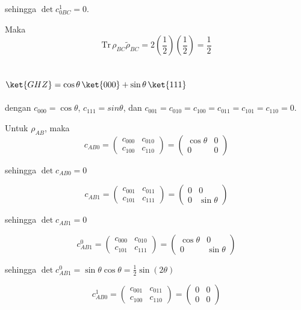 sehingga $\det c_{0BC}^1 = 0$.

Maka
\begin{equation}
	\mathrm{Tr}\,\rho_{BC}\tilde{\rho}_{BC}=2(\frac{1}{2})(\frac{1}{2})=\frac{1}{2}
\end{equation}

\subsection{$\ket{GHZ}=\cos\theta\,\ket{000} + \sin\theta\,\ket{111}$}
dengan $c_{000}=\cos\theta$, $c_{111}=sin\theta$, dan $c_{001}=c_{010}=c_{100}=c_{011}=c_{101}=c_{110}=0$.

Untuk $\rho_{AB}$, maka
\begin{equation}
	c_{AB0}=
	\begin{pmatrix}
		c_{000} & c_{010} \\
		c_{100} & c_{110}
	\end{pmatrix}=
	\begin{pmatrix}
		\cos\theta & 0 \\
		0 & 0
	\end{pmatrix}
\end{equation}

sehingga $\det c_{AB0} = 0$

\begin{equation}
	c_{AB1}=
	\begin{pmatrix}
		c_{001} & c_{011} \\
		c_{101} & c_{111}
	\end{pmatrix}=
	\begin{pmatrix}
		0 & 0 \\
		0 & \sin\theta
	\end{pmatrix}
\end{equation}

sehingga $\det c_{AB1} = 0$

\begin{equation}
	c_{AB1}^0=
	\begin{pmatrix}
		c_{000} & c_{010} \\
		c_{101} & c_{111}
	\end{pmatrix}=
	\begin{pmatrix}
		\cos\theta & 0 \\
		0 & \sin\theta
	\end{pmatrix}
\end{equation}

sehingga $\det c_{AB1}^0 = \sin\theta \cos\theta = \frac{1}{2}\sin(2\theta)$

\begin{equation}
	c_{AB0}^1=
	\begin{pmatrix}
		c_{001} & c_{011} \\
		c_{100} & c_{110}
	\end{pmatrix}=
	\begin{pmatrix}
		0 & 0 \\
		0 & 0
	\end{pmatrix}
\end{equation}

